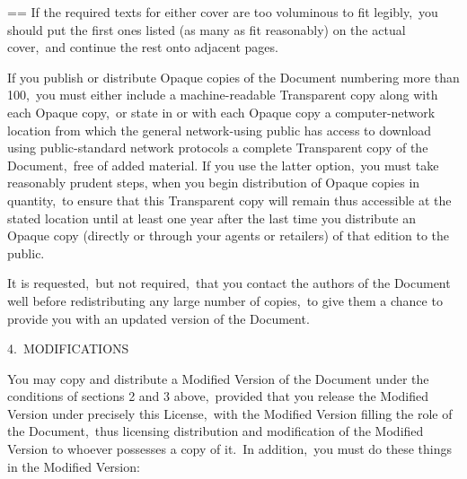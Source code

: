 \documentclass{book}
\makeatletter
\newenvironment{Texinfopreformatted}{%
  \par\GNUTobeylines\obeyspaces\frenchspacing\parskip=\z@\parindent=\z@}{}
{\catcode`\^^M=13 \gdef\GNUTobeylines{\catcode`\^^M=13 \def^^M{\null\par}}}
\newenvironment{Texinfoindented}{\begin{list}{}{}\item\relax}{\end{list}}
\renewcommand{\_}{\Texinfounderscore\discretionary{}{}{}}
\makeatother
\begin{document}
\begin{Texinfoindented}
\begin{Texinfopreformatted}
If the required texts for either cover are too voluminous to fit
legibly,\ you should put the first ones listed (as many as fit
reasonably) on the actual cover,\ and continue the rest onto adjacent
pages.

If you publish or distribute Opaque copies of the Document numbering
more than 100,\ you must either include a machine-readable Transparent
copy along with each Opaque copy,\ or state in or with each Opaque copy
a computer-network location from which the general network-using
public has access to download using public-standard network protocols
a complete Transparent copy of the Document,\ free of added material.
If you use the latter option,\ you must take reasonably prudent steps,
when you begin distribution of Opaque copies in quantity,\ to ensure
that this Transparent copy will remain thus accessible at the stated
location until at least one year after the last time you distribute an
Opaque copy (directly or through your agents or retailers) of that
edition to the public.

It is requested,\ but not required,\ that you contact the authors of the
Document well before redistributing any large number of copies,\ to
give them a chance to provide you with an updated version of the
Document.


4.\ MODIFICATIONS

You may copy and distribute a Modified Version of the Document under
the conditions of sections 2 and 3 above,\ provided that you release
the Modified Version under precisely this License,\ with the Modified
Version filling the role of the Document,\ thus licensing distribution
and modification of the Modified Version to whoever possesses a copy
of it.\  In addition,\ you must do these things in the Modified Version:


\end{Texinfopreformatted}
\end{Texinfoindented}
\end{document}
